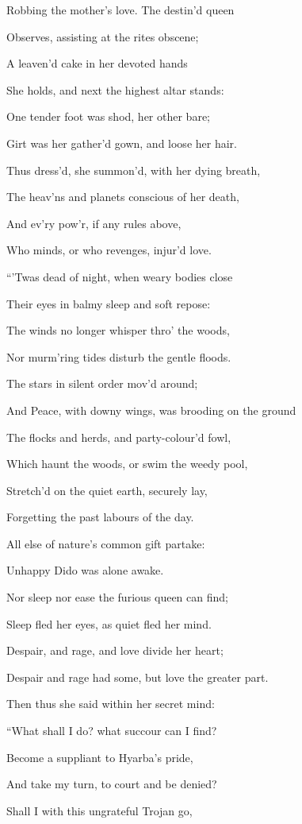 Robbing the mother’s love. The destin’d queen

Observes, assisting at the rites obscene;

A leaven’d cake in her devoted hands

She holds, and next the highest altar stands:

One tender foot was shod, her other bare;

Girt was her gather’d gown, and loose her hair.

Thus dress’d, she summon’d, with her dying breath,

The heav’ns and planets conscious of her death,

And ev’ry pow’r, if any rules above,

Who minds, or who revenges, injur’d love.

“’Twas dead of night, when weary bodies close

Their eyes in balmy sleep and soft repose:

The winds no longer whisper thro’ the woods,

Nor murm’ring tides disturb the gentle floods.

The stars in silent order mov’d around;

And Peace, with downy wings, was brooding on the ground

The flocks and herds, and party-colour’d fowl,

Which haunt the woods, or swim the weedy pool,

Stretch’d on the quiet earth, securely lay,

Forgetting the past labours of the day.

All else of nature’s common gift partake:

Unhappy Dido was alone awake.

Nor sleep nor ease the furious queen can find;

Sleep fled her eyes, as quiet fled her mind.

Despair, and rage, and love divide her heart;

Despair and rage had some, but love the greater part.

Then thus she said within her secret mind:

“What shall I do? what succour can I find?

Become a suppliant to Hyarba’s pride,

And take my turn, to court and be denied?

Shall I with this ungrateful Trojan go,

